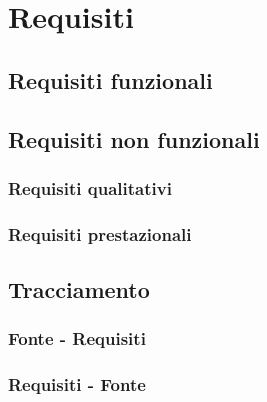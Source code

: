 \section{Requisiti}

\subsection{Requisiti funzionali}

\subsection{Requisiti non funzionali}
\subsubsection{Requisiti qualitativi}
\subsubsection{Requisiti prestazionali}


\subsection{Tracciamento}

\subsubsection{Fonte - Requisiti}
\subsubsection{Requisiti - Fonte}
